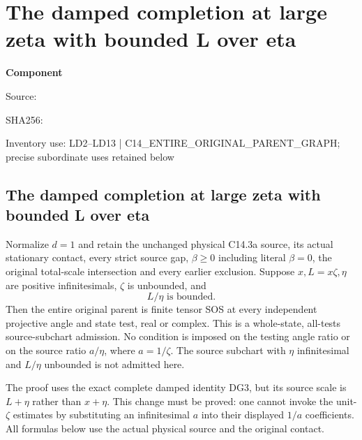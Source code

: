 \chapter{The damped completion at large zeta with bounded L over eta}
\label{component:pc720c1e06aca}
\noindent\textbf{Component }\par
{\small\noindent Source: \par}
{\small\noindent SHA256: \par}
{\small\noindent Inventory use: LD2--LD13 | C14\_\allowbreak{}ENTIRE\_\allowbreak{}ORIGINAL\_\allowbreak{}PARENT\_\allowbreak{}GRAPH; precise subordinate uses retained below\par}
\medskip
\section{The damped completion at large zeta with bounded L over eta}
\label{pc720c1e06aca:sec:r17-large-zeta-damped}

\begin{theorem}
Normalize $d=1$ and retain the unchanged physical C14.3a source,
its actual stationary contact, every strict source gap,
$\beta\ge0$ including literal $\beta=0$, the original total-scale
intersection and every earlier exclusion. Suppose $x,L=x\zeta,\eta$
are positive infinitesimals, $\zeta$ is unbounded, and
\[
                         L/\eta\text{ is bounded}.       \tag{LD1}
\]
Then the entire original parent is finite tensor SOS at every independent
projective angle and state test, real or complex. This is a whole-state,
all-tests source-subchart admission. No condition is imposed on the
testing angle ratio or on the source ratio $a/\eta$, where $a=1/\zeta$.
The source subchart with $\eta$ infinitesimal and $L/\eta$ unbounded
is not admitted here.
\end{theorem}

The proof uses the exact complete damped identity DG3, but its source
scale is $L+\eta$ rather than $x+\eta$. This change must be proved:
one cannot invoke the unit-$\zeta$ estimates by substituting an
infinitesimal $a$ into their displayed $1/a$ coefficients. All formulas
below use the actual physical source and the original contact.

